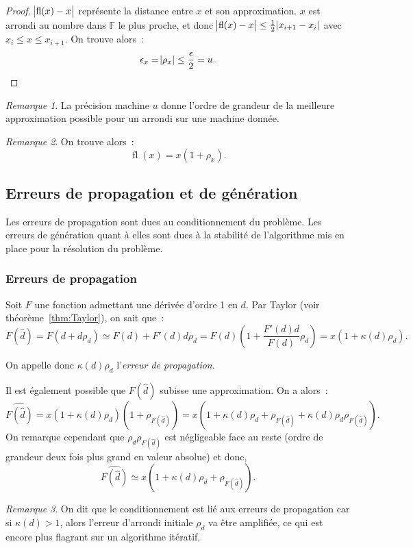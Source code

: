 \documentclass{article}
\theoremstyle{definition}
\theoremstyle{remark}
\newtheorem*{rmq}{Remarque}
\DeclareMathOperator{\fl}{fl}
\newcommand{\F}{\mathbb F}
\begin{document}
		\begin{proof} $\abs {\fl(x)-x}$ représente la distance entre $x$ et son approximation. $x$ est arrondi au nombre dans $\F$ le plus proche, et donc
		$\abs {\fl(x)-x} \leq \frac 12\abs{x_{i+1}-x_{i}}$ avec $x_i \leq x \leq x_{i+1}$. On trouve alors~:
		\[\epsilon_x = \abs {\rho_x} \leq \frac \epsilon2 = u.\]
		\end{proof}

		\begin{rmq} La précision machine $u$ donne l'ordre de grandeur de la meilleure approximation possible pour un arrondi sur une machine donnée. \end{rmq}

		\begin{rmq} On trouve alors~:
		\[\fl(x) = x(1 + \rho_x).\]
		\end{rmq}

	\subsection{Erreurs de propagation et de génération}
		Les erreurs de propagation sont dues au conditionnement du problème. Les erreurs de génération quant à elles sont dues à la stabilité de l'algorithme
		mis en place pour la résolution du problème.

		\subsubsection{Erreurs de propagation}
		Soit $F$ une fonction admettant une dérivée d'ordre 1 en $d$. Par Taylor (voir théorème~\ref{thm:Taylor}), on sait que~:
		\[F(\widehat d) = F(d + d\rho_d) \simeq F(d) + F'(d)d\rho_d = F(d)\left(1 + \frac {F'(d)d}{F(d)}\rho_d\right) = x(1 + \kappa(d)\rho_d).\]

		On appelle donc $\kappa(d)\rho_d$ l'\emph{erreur de propagation}.

		Il est également possible que $F(\widehat d)$ subisse une approximation. On a alors~:
		\[\widehat {F(\widehat d)} = x(1 + \kappa(d)\rho_d)(1 + \rho_{F(\widehat d)})
		= x(1 + \kappa(d)\rho_d + \rho_{F(\widehat d)} + \kappa(d)\rho_d\rho_{F(\widehat d)}).\]
		On remarque cependant que $\rho_d\rho_{F(\widehat d)}$ est négligeable face au reste (ordre de grandeur deux fois plus grand en valeur absolue) et donc,
		\[\widehat {F(\widehat d)} \simeq x(1 + \kappa(d)\rho_d + \rho_{F(\widehat d)}).\]

		\begin{rmq} On dit que le conditionnement est lié aux erreurs de propagation car si $\kappa(d) > 1$, alors l'erreur d'arrondi initiale $\rho_d$ va être
		amplifiée, ce qui est encore plus flagrant sur un algorithme itératif.
		\end{rmq}
\end{document}
